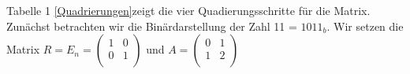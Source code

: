 \documentclass[course=erap]{aspdoc}
\begin{document}
    Tabelle 1 \ref{Quadrierungen}zeigt die vier Quadierungsschritte für die Matrix. Zunächst betrachten wir die Binärdarstellung der Zahl 11 = \begin{math}  1011_b\end{math}. Wir setzen die Matrix \begin{math}
                                                                                                                                                                                                         R =
                                                                                                                                                                                                         E_n = \begin{pmatrix}
                                                                                                                                                                                                                   1 & 0 \\
                                                                                                                                                                                                                   0 & 1 \\
                                                                                                                                                                                                         \end{pmatrix} \end{math}  und \begin{math}
                                                                                                                                                                                                                                           A = \begin{pmatrix}
                                                                                                                                                                                                                                                   0 & 1 \\
                                                                                                                                                                                                                                                   1 & 2 \\
                                                                                                                                                                                                                                           \end{pmatrix}

\end{math}
\end{document}
